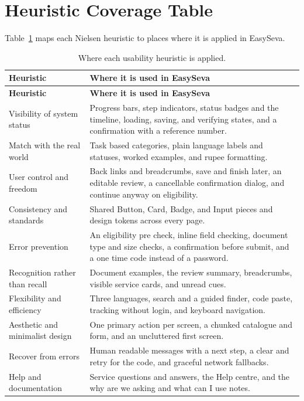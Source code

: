 \documentclass[12pt,a4paper]{article}
\begin{document}
\section{Heuristic Coverage Table}
Table~\ref{tab:matrix} maps each Nielsen heuristic to places where it is applied in
EasySeva.

\begin{longtable}{p{5.1cm} p{9.2cm}}
\caption{Where each usability heuristic is applied.}\label{tab:matrix}\\
\toprule
\textbf{Heuristic} & \textbf{Where it is used in EasySeva} \\
\midrule
\endfirsthead
\toprule
\textbf{Heuristic} & \textbf{Where it is used in EasySeva} \\
\midrule
\endhead
\bottomrule
\endfoot
Visibility of system status & Progress bars, step indicators, status badges and the timeline, loading, saving, and verifying states, and a confirmation with a reference number. \\
Match with the real world & Task based categories, plain language labels and statuses, worked examples, and rupee formatting. \\
User control and freedom & Back links and breadcrumbs, save and finish later, an editable review, a cancellable confirmation dialog, and continue anyway on eligibility. \\
Consistency and standards & Shared Button, Card, Badge, and Input pieces and design tokens across every page. \\
Error prevention & An eligibility pre check, inline field checking, document type and size checks, a confirmation before submit, and a one time code instead of a password. \\
Recognition rather than recall & Document examples, the review summary, breadcrumbs, visible service cards, and unread cues. \\
Flexibility and efficiency & Three languages, search and a guided finder, code paste, tracking without login, and keyboard navigation. \\
Aesthetic and minimalist design & One primary action per screen, a chunked catalogue and form, and an uncluttered first screen. \\
Recover from errors & Human readable messages with a next step, a clear and retry for the code, and graceful network fallbacks. \\
Help and documentation & Service questions and answers, the Help centre, and the why are we asking and what can I use notes. \\
\end{longtable}
\end{document}
